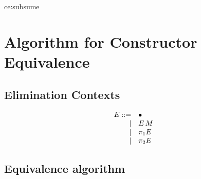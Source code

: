 \documentclass{article}
\theoremstyle{break}
\begin{document}
  {ce:subsume}
  {
   \qquad
   }
  {}

\section{Algorithm for Constructor Equivalence}

\subsection{Elimination Contexts}

\newcommand{\hole}{\bullet}

\[
\begin{array}{rll}
E ::= &\hole\\
    |&\capply{E}{\constructor}\\
    |&\cpi{1}{E}\\
    |&\cpi{2}{E}\\
\end{array}
\]

\subsection{Equivalence algorithm}
\end{document}
